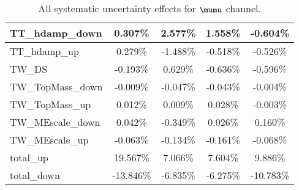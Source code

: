 \begin{table}[]
{\begin{tabular}{|l|c|c|c|c|}
TT\_hdamp\_down                  & 0.307\%                         & 2.577\%                      & 1.558\%                        & -0.604\%                   \\ \hline
TT\_hdamp\_up                    & 0.279\%                           & -1.488\%                        & -0.518\%                          & -0.526\%                     \\ \hline
TW\_DS                      & -0.193\%                             & 0.629\%                          & -0.636\%                            & -0.596\%                       \\ \hline
TW\_TopMass\_down                & -0.009\%                       & -0.047\%                    & -0.043\%                      & -0.004\%                 \\ \hline
TW\_TopMass\_up                & 0.012\%                       & 0.009\%                    & 0.028\%                      & -0.003\%                 \\ \hline
TW\_MEscale\_down             & 0.042\%                    & -0.349\%                 & 0.026\%                   & 0.160\%              \\ \hline
TW\_MEscale\_up               & -0.063\%                      & -0.134\%                   & -0.161\%                     & -0.068\%                \\ \hline
total\_up                          & 19.567\%                           & 7.066\%                           & 7.604\%                          & 9.886\%                           \\ \hline
total\_down                        & -13.846\%                         & -6.835\%                         & -6.275\%                        & -10.783\%                         \\ \hline \hline
\end{tabular}}
\caption{All systematic uncertainty effects for $\mumu$ channel.}
\label{tab:mumu_all}
\end{table}
